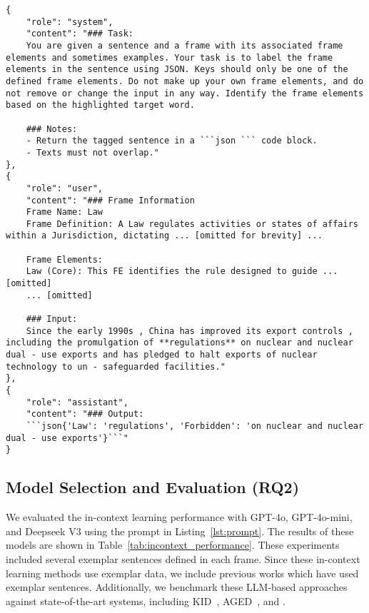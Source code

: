 \begin{lstlisting}[caption={Sample input for fine-tuning.}, label=lst:prompt2]
{
    "role": "system",
    "content": "### Task:
    You are given a sentence and a frame with its associated frame elements and sometimes examples. Your task is to label the frame elements in the sentence using JSON. Keys should only be one of the defined frame elements. Do not make up your own frame elements, and do not remove or change the input in any way. Identify the frame elements based on the highlighted target word. 
    
    ### Notes:
    - Return the tagged sentence in a ```json ``` code block.
    - Texts must not overlap."
},
{
    "role": "user",
    "content": "### Frame Information
    Frame Name: Law
    Frame Definition: A Law regulates activities or states of affairs within a Jurisdiction, dictating ... [omitted for brevity] ...

    Frame Elements:
    Law (Core): This FE identifies the rule designed to guide ... [omitted]
    ... [omitted]
    
    ### Input:
    Since the early 1990s , China has improved its export controls , including the promulgation of **regulations** on nuclear and nuclear dual - use exports and has pledged to halt exports of nuclear technology to un - safeguarded facilities."
},
{
    "role": "assistant",
    "content": "### Output: 
    ```json{'Law': 'regulations', 'Forbidden': 'on nuclear and nuclear dual - use exports'}```"
}
\end{lstlisting}



\subsection{Model Selection and Evaluation (RQ2)}
\label{sec:model-selection}
We evaluated the in-context learning performance with GPT-4o, GPT-4o-mini, and Deepseek V3 using the prompt in Listing~\ref{lst:prompt}. The results of these models are shown in Table~\ref{tab:incontext_performance}. These experiments included several exemplar sentences defined in each frame. Since these in-context learning methods use exemplar data, we include previous works which have used exemplar sentences.  
Additionally, we benchmark these LLM-based approaches against state-of-the-art systems, including KID~\cite{zheng-etal-2022-double}, AGED~\cite{aged2023}, and \citet{Ai_Tu_2024}.

